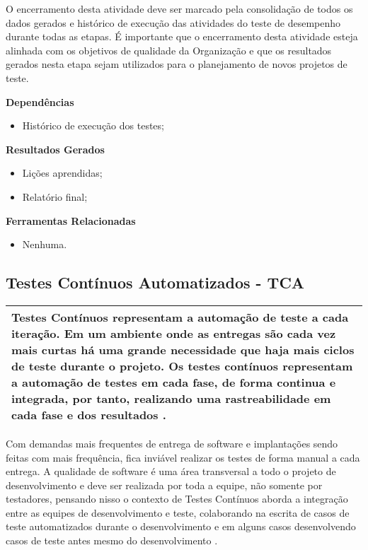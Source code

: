 O encerramento desta atividade deve ser marcado pela consolidação de todos os dados gerados e histórico de execução das atividades do teste de desempenho durante todas as etapas. É importante que o encerramento desta atividade esteja alinhada com os objetivos de qualidade da Organização e que os resultados gerados nesta etapa sejam utilizados para o planejamento de novos projetos de teste.

\textbf{Dependências}
\begin{itemize}
    \item Histórico de execução dos testes;
\end{itemize}

\textbf{Resultados Gerados}
\begin{itemize}
    \item Lições aprendidas;
    \item Relatório final;
\end{itemize}

\textbf{Ferramentas Relacionadas}
\begin{itemize}
    \item Nenhuma.
\end{itemize}


\subsection{Testes Contínuos Automatizados - TCA}
\label{sec:tca}

\begin{table}[!ht]
\centering
\begin{tabular}{|p{130mm}|}
\hline
Testes Contínuos representam a automação de teste a cada iteração. Em um ambiente onde as entregas são cada vez mais curtas há uma grande necessidade que haja mais ciclos de teste durante o projeto. Os testes contínuos representam a automação de testes em cada fase, de forma continua e integrada, por tanto, realizando uma rastreabilidade em cada fase e dos resultados \cite{humble2010}. \\
\hline
\end{tabular}
\end{table}

Com demandas mais frequentes de entrega de software e implantações sendo feitas com mais frequência, fica inviável realizar os testes de forma manual a cada entrega. A qualidade de software é uma área transversal a todo o projeto de desenvolvimento e deve ser realizada por toda a equipe, não somente por testadores, pensando nisso o contexto de Testes Contínuos aborda a integração entre as equipes de desenvolvimento e teste, colaborando na escrita de casos de teste automatizados durante o desenvolvimento e em alguns casos desenvolvendo casos de teste antes mesmo do desenvolvimento \cite{humble2010}.

